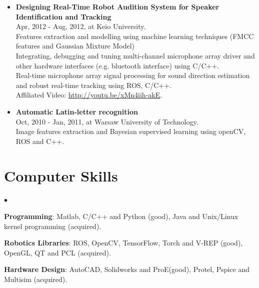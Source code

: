 \documentclass[margin,line]{res}
\newenvironment{list2}{
  \begin{list}{$\bullet$}{%
      \setlength{\itemsep}{0in}
      \setlength{\parsep}{0in} \setlength{\parskip}{0in}
      \setlength{\topsep}{0in} \setlength{\partopsep}{0in} 
      \setlength{\leftmargin}{0.2in}}}{\end{list}}
\begin{document}
\begin{resume}
\begin{itemize}
\item {\bf  Designing Real-Time Robot Audition System for Speaker Identification and Tracking}\\
Apr, 2012 - Aug, 2012, at Keio University.\\
Features extraction and modelling using machine learning techniques (FMCC features and Gaussian Mixture Model)\\
Integrating, debugging and tuning multi-channel microphone array driver and other hardware interfaces (e.g. bluetooth interface) using C/C++.\\ 
Real-time microphone array signal processing for sound direction estimation and robust real-time tracking using ROS, C/C++.\\
Affiliated Video: \href{http://youtu.be/xMn4iih-akE}{http://youtu.be/xMn4iih-akE}.\\

%
\item {\bf Automatic Latin-letter recognition}\\
Oct, 2010 - Jan, 2011, at Warsaw University of Technology.\\
Image features extraction and Bayesian supervised learning using openCV, ROS and C++.\\

\end{itemize}



\section{\sc Computer Skills} 
\begin{list2}
\item {\bf Programming}: Matlab, C/C++ and Python (good), Java and Unix/Linux kernel programming (acquired). \\

\item {\bf Robotics Libraries}: ROS, OpenCV, TensorFlow, Torch and V-REP (good), OpenGL, QT and PCL (acquired).\\

\item {\bf Hardware Design}: AutoCAD, Solidworks and ProE(good), Protel, Pspice and Multisim (acquired).\\


\end{list2}
\end{resume}
\end{document}
